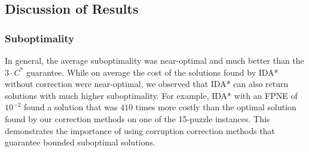 \documentclass[letterpaper]{article}
\begin{document}
\subsection{Discussion of Results}




\subsubsection{Suboptimality}
In general, the average suboptimality was near-optimal and much better than the $3\cdot C^*$ guarantee. While on average the cost of the solutions found by IDA* without correction were near-optimal, we observed that IDA* can also return solutions with much higher suboptimality. For example, IDA* with an FPNE of $10^{-2}$ found a solution that was $410$ times more costly than %
the optimal solution found by our correction methods 
on one of the 15-puzzle instances. 
This demonstrates the importance of using corruption correction methods that guarantee bounded suboptimal solutions.
\end{document}
